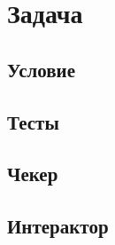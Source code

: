 \section{Задача}

\subsection{}

\subsection{Условие}

\subsection{Тесты}

\subsection{Чекер}

\subsection{Интерактор}
